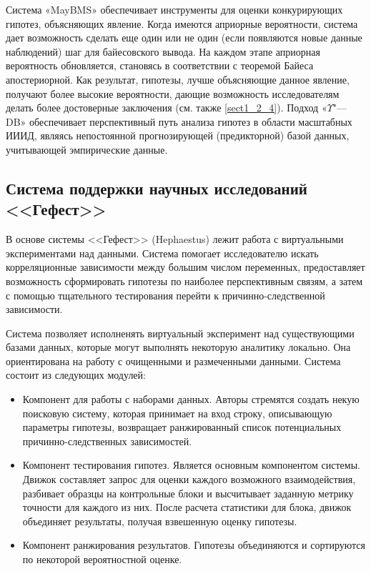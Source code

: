 Система «MayBMS» обеспечивает инструменты для оценки конкурирующих гипотез, объясняющих явление. Когда имеются 
априорные вероятности, система дает возможность сделать еще один или не один (если появляются новые данные наблюдений) 
шаг для байесовского вывода. На каждом этапе априорная вероятность обновляется, становясь в соответствии с теоремой 
Байеса апостериорной. Как результат, гипотезы, лучше объясняющие данное явление, получают более высокие вероятности, 
дающие возможность исследователям делать более достоверные заключения (см. также \cref{sect1_2_4}). 
Подход «$\Upsilon$"---DB» обеспечивает перспективный путь анализа гипотез в области масштабных ИИИД, являясь 
непостоянной прогнозирующей (предикторной) базой данных, учитывающей эмпирические данные.


\subsection{Система поддержки научных исследований <<Гефест>>}\label{sect1_3_4}
В основе системы <<Гефест>> (Hephaestus) \cite{Duggan2015} лежит работа с виртуальными экспериментами над данными. 
Система помогает исследователю искать корреляционные зависимости между большим числом переменных, предоставляет 
возможность сформировать гипотезы по наиболее перспективным связям, а затем с помощью тщательного тестирования перейти 
к причинно-следственной зависимости. 

Система позволяет исполненять виртуальный эксперимент над существующими базами данных, которые могут выполнять 
некоторую аналитику локально. Она ориентирована на работу с очищенными и размеченными данными. Система состоит из 
следующих модулей:
\begin{itemize}
    \item Компонент для работы с наборами данных. Авторы стремятся создать некую поисковую систему, которая принимает 
            на вход строку, описывающую параметры гипотезы, возвращает ранжированный список потенциальных 
            причинно-следственных зависимостей.
    \item Компонент тестирования гипотез. Является основным компонентом системы. Движок составляет запрос для оценки 
            каждого возможного взаимодействия, разбивает образцы на контрольные блоки и высчитывает заданную метрику 
            точности для каждого из них. После расчета статистики для блока, движок объединяет результаты, получая 
            взвешенную оценку гипотезы.
    \item Компонент ранжирования результатов. Гипотезы объединяются и сортируются по некоторой вероятностной оценке.
\end{itemize}


